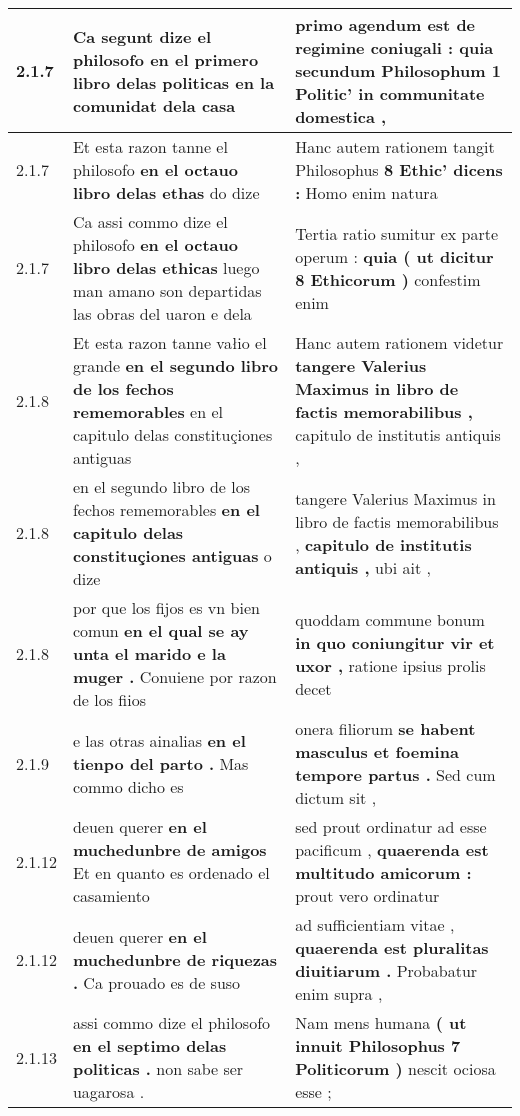 \begin{tabular}{|p{1cm}|p{6.5cm}|p{6.5cm}|}
2.1.7 & Ca segunt dize el philosofo \textbf{ en el primero libro delas politicas } en la comunidat dela casa & primo agendum est de regimine coniugali : \textbf{ quia secundum Philosophum 1 Politic’ } in communitate domestica , \\\hline
2.1.7 & Et esta razon tanne el philosofo \textbf{ en el octauo libro delas ethas } do dize & Hanc autem rationem tangit Philosophus \textbf{ 8 Ethic’ dicens : } Homo enim natura \\\hline
2.1.7 & Ca assi commo dize el philosofo \textbf{ en el octauo libro delas ethicas } luego man amano son departidas las obras del uaron e dela & Tertia ratio sumitur ex parte operum : \textbf{ quia ( ut dicitur 8 Ethicorum ) } confestim enim \\\hline
2.1.8 & Et esta razon tanne vałio el grande \textbf{ en el segundo libro de los fechos rememorables } en el capitulo delas constituçiones antiguas & Hanc autem rationem videtur \textbf{ tangere Valerius Maximus in libro de factis memorabilibus , } capitulo de institutis antiquis , \\\hline
2.1.8 & en el segundo libro de los fechos rememorables \textbf{ en el capitulo delas constituçiones antiguas } o dize & tangere Valerius Maximus in libro de factis memorabilibus , \textbf{ capitulo de institutis antiquis , } ubi ait , \\\hline
2.1.8 & por que los fijos es vn bien comun \textbf{ en el qual se ay unta el marido e la muger . } Conuiene por razon de los fiios & quoddam commune bonum \textbf{ in quo coniungitur vir et uxor , } ratione ipsius prolis decet \\\hline
2.1.9 & e las otras ainalias \textbf{ en el tienpo del parto . } Mas commo dicho es & onera filiorum \textbf{ se habent masculus et foemina tempore partus . } Sed cum dictum sit , \\\hline
2.1.12 & deuen querer \textbf{ en el muchedunbre de amigos } Et en quanto es ordenado el casamiento & sed prout ordinatur ad esse pacificum , \textbf{ quaerenda est multitudo amicorum : } prout vero ordinatur \\\hline
2.1.12 & deuen querer \textbf{ en el muchedunbre de riquezas . } Ca prouado es de suso & ad sufficientiam vitae , \textbf{ quaerenda est pluralitas diuitiarum . } Probabatur enim supra , \\\hline
2.1.13 & assi commo dize el philosofo \textbf{ en el septimo delas politicas . } non sabe ser uagarosa . & Nam mens humana \textbf{ ( ut innuit Philosophus 7 Politicorum ) } nescit ociosa esse ; \\\hline

\end{tabular}
